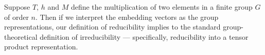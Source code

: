 \documentclass{article} %
\theoremstyle{plain}
\theoremstyle{definition}
\newtheorem{definition}{Definition}
\begin{document}
Suppose $T$, $h$ and $M$ define the multiplication of two elements in a finite group $G$ of order $n$. Then if we interpret the embedding vectors as the group representations, our definition of reducibility implies to the standard group-theoretical definition of irreducibility –– specifically, reducibility into a tensor product representation.








\end{document}
